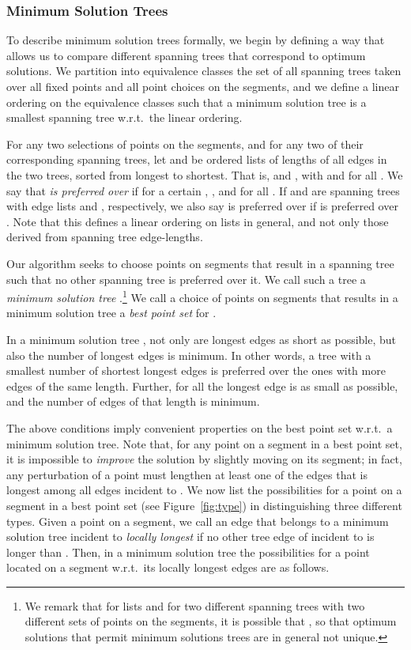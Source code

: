 \subsubsection*{Minimum Solution Trees}
To describe minimum solution trees formally, we begin by defining a
way that allows us to compare different spanning trees that correspond
to optimum solutions. We partition into equivalence classes the set of
all spanning trees taken over all fixed points and all point choices
on the  segments, and we define a linear ordering on the
equivalence classes such that a minimum solution tree is a smallest
spanning tree w.r.t.~the linear ordering.

For any two selections of points on the  segments, and for any two of their corresponding spanning trees, let  and  be ordered lists of lengths of all edges in the two trees, sorted from longest to shortest. That is,  and , with  and  for all .
We say that  \emph{is preferred over}  if for a
certain , , and  for all .  If 
and  are spanning trees with edge lists  and
, respectively, we also say  is preferred over
 if  is preferred over .
Note that this defines a linear ordering on lists in general, and not
only those derived from spanning tree edge-lengths.

Our algorithm seeks to choose points on segments that result in a
spanning tree such that no other spanning tree is preferred over it.
 We call such a tree a \emph{minimum solution tree} .\footnote{We remark that for lists  and  for two different spanning trees with two different sets of points on the segments, it is possible that , so that optimum solutions that permit minimum solutions trees are in general not unique.} We call a choice of points on segments that results in a minimum solution tree    a \emph{best point set} for  .

In a minimum solution tree , not only are longest edges as short as possible, but also the number of longest edges is minimum. In other words, a tree with a smallest number of shortest longest edges is preferred over the ones with more edges of the same length.
Further, for all  the   longest edge is as small as possible, and the number of edges of that length is minimum.


The above conditions imply convenient properties on the best point set w.r.t.~a minimum solution tree.
Note that, for any point  on a segment in a best point set, it is impossible to {\em improve} the solution by slightly moving  on its segment; in fact, any perturbation of a point must lengthen at least one of the edges
that is longest among all edges incident to .
We now list the possibilities for a point  on a segment in a best point set (see Figure~\ref{fig:type}) in distinguishing three different types. Given a point  on a segment, we call an edge  that belongs to a minimum solution tree  incident to  {\em  locally longest} if no other tree edge of  incident to  is longer than . Then, in a minimum solution tree the possibilities for a point located on a segment  w.r.t.~its locally longest edges are as follows.

